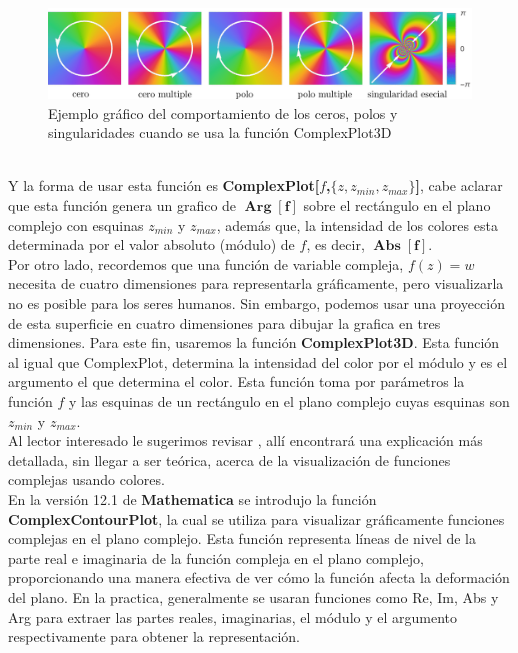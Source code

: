 \begin{figure}[h!]
	\centering
	\includegraphics[width=0.75\linewidth]{img/plotco}
	\caption{Ejemplo gráfico del comportamiento de los ceros, polos y singularidades cuando se usa la función ComplexPlot3D}
	\label{fig:plotco}
\end{figure}
\\Y la forma de usar esta función es \textbf{ComplexPlot[$f$,$\{z,z_{min},z_{max}\}$]}, cabe aclarar que esta función genera un grafico de $\mathbf{\operatorname{Arg}[f]}$ sobre el rectángulo en el plano complejo con esquinas $z_{min}$ y $z_{max}$, además que,  la intensidad de los colores esta determinada por el valor absoluto (módulo) de $f$, es decir,  $\mathbf{\operatorname{Abs}[f]}$.\\
Por otro lado, recordemos que una función de variable compleja, $f(z)=w$ necesita de cuatro dimensiones para representarla gráficamente, pero visualizarla no es posible para los seres humanos. Sin embargo, podemos usar una proyección de esta superficie en cuatro dimensiones para dibujar la grafica en tres dimensiones. Para este fin, usaremos la función  \textbf{ComplexPlot3D}. Esta función al igual que ComplexPlot, determina la intensidad del color por el módulo y es el argumento el que determina el color. Esta función toma por parámetros la función $f$ y las esquinas de un rectángulo en el plano complejo cuyas esquinas son $z_{min}$ y $z_{max}$. \\

\noindent Al lector interesado le sugerimos revisar \cite{Domain_coloring}, allí encontrará una explicación más detallada, sin llegar a ser teórica, acerca de la visualización de funciones complejas usando colores.\\

En la versión 12.1 de \textbf{Mathematica} se introdujo la función \textbf{ComplexContourPlot}, la cual se utiliza para  visualizar gráficamente funciones complejas en el plano complejo. Esta función representa líneas de nivel de la parte real e imaginaria de la función compleja en el plano complejo, proporcionando una manera efectiva de ver cómo la función afecta la deformación del plano. En la practica, generalmente se usaran funciones como Re, Im, Abs y Arg para extraer las partes reales, imaginarias, el módulo y el argumento respectivamente para obtener la representación.


